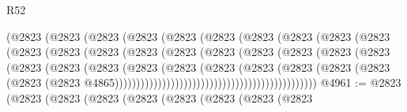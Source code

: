 \begin{lexlean}{R52}
\begin{coremodule}
                                  (@2823
                                    (@2823
                                      (@2823
                                        (@2823
                                          (@2823
                                            (@2823
                                              (@2823
                                                (@2823
                                                  (@2823
                                                    (@2823
                                                      (@2823
                                                        (@2823
                                                          (@2823
                                                            (@2823
                                                              (@2823
                                                                (@2823
                                                                  (@2823
                                                                    (@2823
                                                                      (@2823
                                                                        (@2823
                                                                          (@2823
                                                                            (@2823
                                                                              (@2823
                                                                                (@2823
                                                                                  (@2823
                                                                                    (@2823
                                                                                      (@2823
                                                                                        (@2823
                                                                                          (@2823
                                                                                            (@2823
                                                                                              (@2823
                                                                                                (@2823
                                                                                                  @4865)))))))))))))))))))))))))))))))))))))))))))))))
@4961 := @2823
    (@2823
      (@2823
        (@2823
          (@2823
            (@2823
              (@2823
                (@2823
                  (@2823

\end{coremodule}
\end{lexlean}
